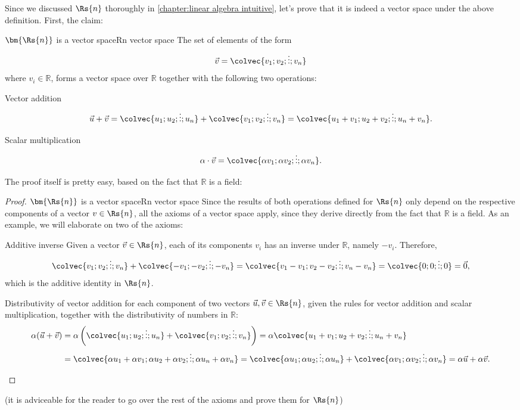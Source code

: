 Since we discussed $\Rs{n}$ thoroughly in \autoref{chapter:linear algebra intuitive}, let's prove that it is indeed a vector space under the above definition. First, the claim:

\begin{theorem}{$\bm{\Rs{n}}$ is a vector space}{Rn vector space}
	The set of elements of the form
	\[
		\vec{v} = \colvec{v_{1};v_{2};\vdots;v_{n}}
	\]
	where $v_{i}\in\mathbb{R}$, forms a vector space over $\mathbb{R}$ together with the following two operations:
	\begin{descitemize}
		\item[Vector addition]
			\[
				\vec{u}+\vec{v} = \colvec{u_{1};u_{2};\vdots;u_{n}} + \colvec{v_{1};v_{2};\vdots;v_{n}} = \colvec{u_{1}+v_{1};u_{2}+v_{2};\vdots;u_{n}+v_{n}}.
			\]
		\item[Scalar multiplication]
			\[
				\alpha\cdot\vec{v} = \colvec{\alpha v_{1};\alpha v_{2};\vdots;\alpha v_{n}}.
			\]
	\end{descitemize}
\end{theorem}

The proof itself is pretty easy, based on the fact that $\mathbb{R}$ is a field:

\begin{proof}{$\bm{\Rs{n}}$ is a vector space}{Rn vector space}
	Since the results of both operations defined for $\Rs{n}$ only depend on the respective components of a vector $v\in\Rs{n}$, all the axioms of a vector space apply, since they derive directly from the fact that $\mathbb{R}$ is a field. As an example, we will elaborate on two of the axioms:
	\begin{descitemize}
	\item[Additive inverse] Given a vector $\vec{v}\in\Rs{n}$, each of its components $v_{i}$ has an inverse under $\mathbb{R}$, namely $-v_{i}$. Therefore,
		\[
			\colvec{v_{1};v_{2};\vdots;v_{n}} + \colvec{-v_{1};-v_{2};\vdots;-v_{n}} = \colvec{v_{1}-v_{1};v_{2}-v_{2};\vdots;v_{n}-v_{n}} = \colvec{0;0;\vdots;0} = \vec{0},
		\]
		which is the additive identity in $\Rs{n}$.

	\item[Distributivity of vector addition] for each component of two vectors $\vec{u},\vec{v}\in\Rs{n}$, given the rules for vector addition and scalar multiplication, together with the distributivity of numbers in $\mathbb{R}$:
		\begin{align*}
			\alpha (\vec{u}+\vec{v}) &= \alpha\left(\colvec{u_{1};u_{2};\vdots;u_{n}} + \colvec{v_{1};v_{2};\vdots;v_{n}}\right) = \alpha\colvec{u_{1}+v_{1};u_{2}+v_{2};\vdots;u_{n}+v_{n}}\\
			&= \colvec{\alpha u_{1}+\alpha v_{1};\alpha u_{2} + \alpha v_{2};\vdots;\alpha u_{n} + \alpha v_{n}} = \colvec{\alpha u_{1};\alpha u_{2};\vdots;\alpha u_{n}} + \colvec{\alpha v_{1};\alpha v_{2};\vdots;\alpha v_{n}} = \alpha\vec{u} + \alpha\vec{v}.
		\end{align*}
	\end{descitemize}
\end{proof}
(it is adviceable for the reader to go over the rest of the axioms and prove them for $\Rs{n}$)


